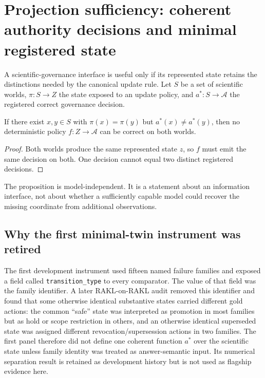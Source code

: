 \section{Projection sufficiency: coherent authority decisions and minimal registered state}

A scientific-governance interface is useful only if its represented state retains the distinctions needed by the canonical update rule. Let $S$ be a set of scientific worlds, $\pi:S\to Z$ the state exposed to an update policy, and $a^*:S\to\mathcal A$ the registered correct governance decision.

\begin{proposition}
If there exist $x,y\in S$ with $\pi(x)=\pi(y)$ but $a^*(x)\neq a^*(y)$, then no deterministic policy $f:Z\to\mathcal A$ can be correct on both worlds.
\end{proposition}
\begin{proof}
Both worlds produce the same represented state $z$, so $f$ must emit the same decision on both. One decision cannot equal two distinct registered decisions.
\end{proof}

The proposition is model-independent. It is a statement about an information interface, not about whether a sufficiently capable model could recover the missing coordinate from additional observations.

\subsection{Why the first minimal-twin instrument was retired}

The first development instrument used fifteen named failure families and exposed a field called \texttt{transition\_type} to every comparator. The value of that field was the family identifier. A later RAKL-on-RAKL audit removed this identifier and found that some otherwise identical substantive states carried different gold actions: the common ``safe'' state was interpreted as promotion in most families but as hold or scope restriction in others, and an otherwise identical superseded state was assigned different revocation/supersession actions in two families. The first panel therefore did not define one coherent function $a^*$ over the scientific state unless family identity was treated as answer-semantic input. Its numerical separation result is retained as development history but is not used as flagship evidence here.

